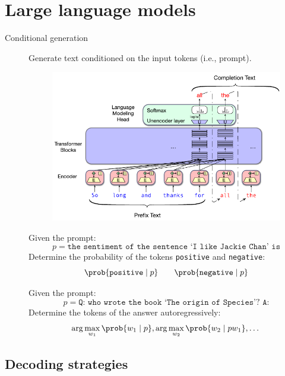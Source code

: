\chapter{Large language models}


\begin{description}
    \item[Conditional generation] 
        Generate text conditioned on the input tokens (i.e., prompt).

        \begin{figure}[H]
            \centering
            \includegraphics[width=0.45\linewidth]{./img/_conditional_generation.pdf}
        \end{figure}

        \begin{example}
            Given the prompt:
            \[ p = \texttt{the sentiment of the sentence `I like Jackie Chan' is} \]
            Determine the probability of the tokens \texttt{positive} and \texttt{negative}:
            \[
                \prob{\texttt{positive} \mid p} \qquad \prob{\texttt{negative} \mid p}
            \]
        \end{example}

        \begin{example}
            Given the prompt:
            \[ p = \texttt{Q: who wrote the book `The origin of Species'? A:} \]
            Determine the tokens of the answer autoregressively:
            \[
                \arg\max_{w_1} \prob{w_1 \mid p}, \arg\max_{w_2} \prob{w_2 \mid pw_1}, \dots
            \]
        \end{example}
\end{description}


\section{Decoding strategies}

